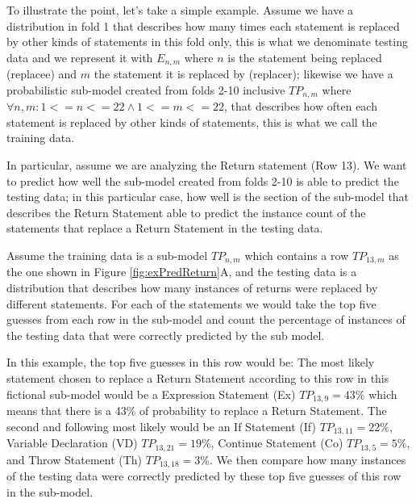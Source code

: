 \documentclass[conference]{IEEEtran}
\begin{document}
To illustrate the point, let's take a simple example. Assume we have a 
distribution in fold 1 that describes how many times each statement is replaced 
by other kinds of statements in this fold 
only, this is what we denominate testing data and we represent it with $E_{n,m}$ 
where $n$ is the statement being replaced (replacee) and $m$ the statement it is 
replaced by (replacer); likewise we have a probabilistic sub-model created from 
folds 2-10 inclusive $TP_{n,m}$ where $\forall n,m: 1<=n<=22 \land 1<=m<=22$, 
that describes how often each statement is replaced by 
other kinds of statements, this is what we call the training data. 

In 
particular, assume we are analyzing the Return statement (Row 13). We want to 
predict 
how well the sub-model created from folds 2-10 is able to predict the testing 
data; in this particular case, how well is the section of the sub-model that 
describes the Return Statement able to predict the instance count of the 
statements that replace a Return Statement in the testing data.

Assume the training data is a sub-model $TP_{n,m}$ which contains a row 
$TP_{13,m}$ as the one shown in Figure 
\ref{fig:exPredReturn}A, and the testing data is a distribution that describes 
how many instances of returns were replaced by different statements.
For each of the statements we would take the top five guesses from each row in 
the sub-model and count the percentage of instances of the testing data that were correctly 
predicted by the sub model. 

In this example, the top five guesses in this row would be: The most 
likely statement chosen to replace a Return Statement according to this row in 
this fictional sub-model would be a Expression Statement (Ex) $TP_{13,9} = 43\%$ 
which means that there is a 43\% of probability to replace a Return Statement. 
The second and following most likely would be an If Statement (If) $TP_{13,11} = 22\%$, Variable Declaration (VD)  $TP_{13,21} = 19\%$, 
Continue Statement (Co)  $TP_{13,5} = 5\%$, and Throw Statement (Th) $TP_{13,18} = 3\%$. We then compare how many instances of the testing data were correctly predicted 
by these top five guesses of this row in the sub-model. 
\end{document}

